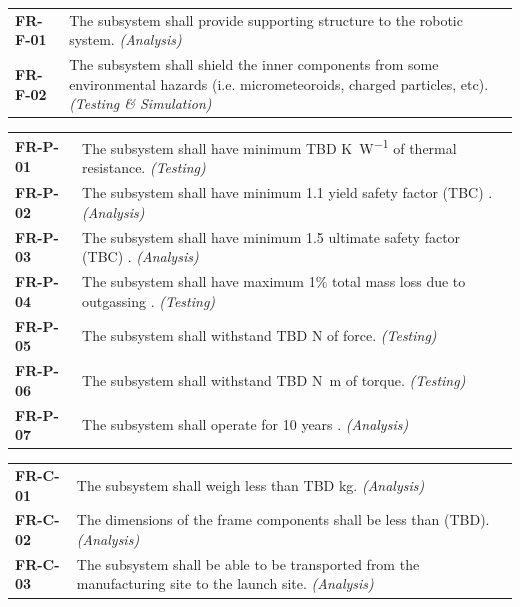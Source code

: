 \documentclass[12pt, letterpaper]{article}
\begin{document}
\vspace{-5pt}
\begin{longtable}{P{2cm}P{13.75cm}}
\textbf{FR-F-01}	& The subsystem shall provide supporting structure to the robotic system. \textit{(Analysis)}							\\
\textbf{FR-F-02}	& The subsystem shall shield the inner components from some environmental hazards (i.e. micrometeoroids, charged particles, etc). \textit{(Testing \& Simulation)}					\\
\end{longtable}
\vspace{-10pt}
\begin{longtable}{P{2cm}P{13.75cm}}
\textbf{FR-P-01}	& The subsystem shall have minimum TBD \si{\K\per\watt} of thermal resistance. \textit{(Testing)}						\\
\textbf{FR-P-02}	& The subsystem shall have minimum 1.1 yield safety factor (TBC) \cite{NASAsysreq_Kumar}. \textit{(Analysis)}						\\
\textbf{FR-P-03}	& The subsystem shall have minimum 1.5 ultimate safety factor (TBC) \cite{NASAsysreq_Kumar}. \textit{(Analysis)}				\\
\textbf{FR-P-04}	& The subsystem shall have maximum 1\% total mass loss due to outgassing \cite{NASA_outgassing}. \textit{(Testing)}			\\
\textbf{FR-P-05}	& The subsystem shall withstand TBD \si{N} of force. \textit{(Testing)}													\\
\textbf{FR-P-06}	& The subsystem shall withstand TBD \si{\N\m} of torque. \textit{(Testing)}											\\
\textbf{FR-P-07}	& The subsystem shall operate for 10 years \cite{RFP}. \textit{(Analysis)}										\\
\end{longtable}
\vspace{-10pt}
\begin{longtable}{P{2cm}P{13.75cm}}
\textbf{FR-C-01}	& The subsystem shall weigh less than TBD \si{\kg}. \textit{(Analysis)}													\\
\textbf{FR-C-02}	& The dimensions of the frame components shall be less than (TBD). \textit{(Analysis)}									\\
\textbf{FR-C-03}	& The subsystem shall be able to be transported from the manufacturing site to the launch site. \textit{(Analysis)}	\\
\end{longtable}
\vspace{-10pt}
\end{document}
